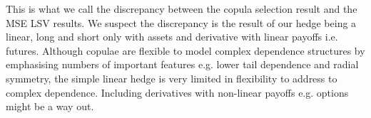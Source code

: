 This is what we call the discrepancy between the copula selection result and the MSE LSV results.
We suspect the discrepancy is the result of our hedge being a linear, long and short only with assets and derivative with linear payoffs i.e. futures.
Although copulae are flexible to model complex dependence structures by emphasising numbers of important features
e.g. lower tail dependence and radial symmetry, the simple linear hedge is very limited in flexibility to address to complex dependence.
Including derivatives with non-linear payoffs e.g. options might be a way out. \medskip

